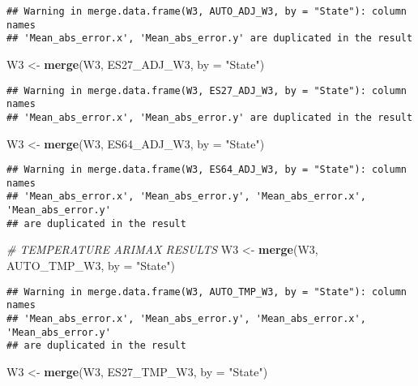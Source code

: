 \documentclass[
]{article}
\newenvironment{Shaded}{\begin{snugshade}}{\end{snugshade}}
\newcommand{\AttributeTok}[1]{\textcolor[rgb]{0.13,0.29,0.53}{#1}}
\newcommand{\CommentTok}[1]{\textcolor[rgb]{0.56,0.35,0.01}{\textit{#1}}}
\newcommand{\FunctionTok}[1]{\textcolor[rgb]{0.13,0.29,0.53}{\textbf{#1}}}
\newcommand{\NormalTok}[1]{#1}
\newcommand{\OtherTok}[1]{\textcolor[rgb]{0.56,0.35,0.01}{#1}}
\newcommand{\StringTok}[1]{\textcolor[rgb]{0.31,0.60,0.02}{#1}}
\begin{document}
\begin{verbatim}
## Warning in merge.data.frame(W3, AUTO_ADJ_W3, by = "State"): column names
## 'Mean_abs_error.x', 'Mean_abs_error.y' are duplicated in the result
\end{verbatim}

\begin{Shaded}
\begin{Highlighting}[]
\NormalTok{W3 }\OtherTok{\textless{}{-}} \FunctionTok{merge}\NormalTok{(W3, ES27\_ADJ\_W3, }\AttributeTok{by =} \StringTok{"State"}\NormalTok{)}
\end{Highlighting}
\end{Shaded}

\begin{verbatim}
## Warning in merge.data.frame(W3, ES27_ADJ_W3, by = "State"): column names
## 'Mean_abs_error.x', 'Mean_abs_error.y' are duplicated in the result
\end{verbatim}

\begin{Shaded}
\begin{Highlighting}[]
\NormalTok{W3 }\OtherTok{\textless{}{-}} \FunctionTok{merge}\NormalTok{(W3, ES64\_ADJ\_W3, }\AttributeTok{by =} \StringTok{"State"}\NormalTok{)}
\end{Highlighting}
\end{Shaded}

\begin{verbatim}
## Warning in merge.data.frame(W3, ES64_ADJ_W3, by = "State"): column names
## 'Mean_abs_error.x', 'Mean_abs_error.y', 'Mean_abs_error.x', 'Mean_abs_error.y'
## are duplicated in the result
\end{verbatim}

\begin{Shaded}
\begin{Highlighting}[]
\CommentTok{\# TEMPERATURE ARIMAX RESULTS}
\NormalTok{W3 }\OtherTok{\textless{}{-}} \FunctionTok{merge}\NormalTok{(W3, AUTO\_TMP\_W3, }\AttributeTok{by =} \StringTok{"State"}\NormalTok{)}
\end{Highlighting}
\end{Shaded}

\begin{verbatim}
## Warning in merge.data.frame(W3, AUTO_TMP_W3, by = "State"): column names
## 'Mean_abs_error.x', 'Mean_abs_error.y', 'Mean_abs_error.x', 'Mean_abs_error.y'
## are duplicated in the result
\end{verbatim}

\begin{Shaded}
\begin{Highlighting}[]
\NormalTok{W3 }\OtherTok{\textless{}{-}} \FunctionTok{merge}\NormalTok{(W3, ES27\_TMP\_W3, }\AttributeTok{by =} \StringTok{"State"}\NormalTok{)}
\end{Highlighting}
\end{Shaded}
\end{document}
